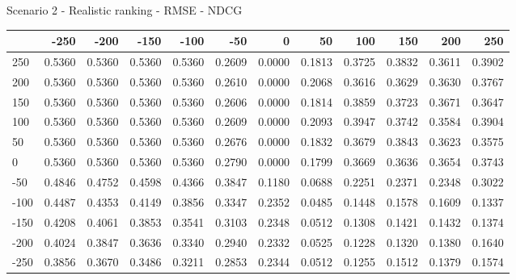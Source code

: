 Scenario 2 - Realistic ranking - RMSE - NDCG
\begin{tabular}{lrrrrrrrrrrr}
\toprule
{} &   -250 &   -200 &   -150 &   -100 &   -50  &    0   &    50  &    100 &    150 &    200 &    250 \\
\midrule
 250 & 0.5360 & 0.5360 & 0.5360 & 0.5360 & 0.2609 & 0.0000 & 0.1813 & 0.3725 & 0.3832 & 0.3611 & 0.3902 \\
 200 & 0.5360 & 0.5360 & 0.5360 & 0.5360 & 0.2610 & 0.0000 & 0.2068 & 0.3616 & 0.3629 & 0.3630 & 0.3767 \\
 150 & 0.5360 & 0.5360 & 0.5360 & 0.5360 & 0.2606 & 0.0000 & 0.1814 & 0.3859 & 0.3723 & 0.3671 & 0.3647 \\
 100 & 0.5360 & 0.5360 & 0.5360 & 0.5360 & 0.2609 & 0.0000 & 0.2093 & 0.3947 & 0.3742 & 0.3584 & 0.3904 \\
 50  & 0.5360 & 0.5360 & 0.5360 & 0.5360 & 0.2676 & 0.0000 & 0.1832 & 0.3679 & 0.3843 & 0.3623 & 0.3575 \\
 0   & 0.5360 & 0.5360 & 0.5360 & 0.5360 & 0.2790 & 0.0000 & 0.1799 & 0.3669 & 0.3636 & 0.3654 & 0.3743 \\
-50  & 0.4846 & 0.4752 & 0.4598 & 0.4366 & 0.3847 & 0.1180 & 0.0688 & 0.2251 & 0.2371 & 0.2348 & 0.3022 \\
-100 & 0.4487 & 0.4353 & 0.4149 & 0.3856 & 0.3347 & 0.2352 & 0.0485 & 0.1448 & 0.1578 & 0.1609 & 0.1337 \\
-150 & 0.4208 & 0.4061 & 0.3853 & 0.3541 & 0.3103 & 0.2348 & 0.0512 & 0.1308 & 0.1421 & 0.1432 & 0.1374 \\
-200 & 0.4024 & 0.3847 & 0.3636 & 0.3340 & 0.2940 & 0.2332 & 0.0525 & 0.1228 & 0.1320 & 0.1380 & 0.1640 \\
-250 & 0.3856 & 0.3670 & 0.3486 & 0.3211 & 0.2853 & 0.2344 & 0.0512 & 0.1255 & 0.1512 & 0.1379 & 0.1574 \\
\bottomrule
\end{tabular}

